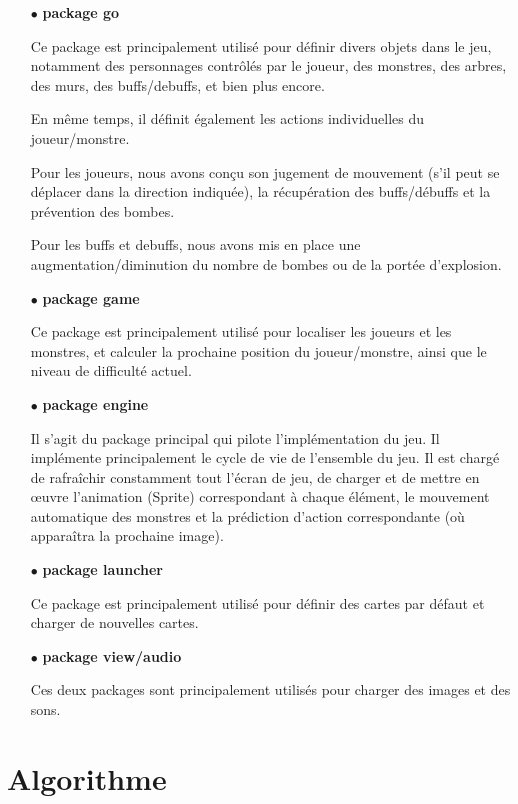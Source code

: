 \documentclass[11pt,english]{article}
\begin{document}
\begin{itemize}
    \item [$\bullet$] \textbf{package go}
    
    Ce package est principalement utilisé pour définir divers objets dans le jeu, notamment des personnages contrôlés par le joueur, des monstres, des arbres, des murs, des buffs/debuffs, et bien plus encore.
    
    En même temps, il définit également les actions individuelles du joueur/monstre. 

    Pour les joueurs, nous avons conçu son jugement de mouvement (s'il peut se déplacer dans la direction indiquée), la récupération des buffs/débuffs et la prévention des bombes.

    Pour les buffs et debuffs, nous avons mis en place une augmentation/diminution du nombre de bombes ou de la portée d'explosion.

    \item [$\bullet$] \textbf{package game}
    
    Ce package est principalement utilisé pour localiser les joueurs et les monstres, et calculer la prochaine position du joueur/monstre, ainsi que le niveau de difficulté actuel.

    \item [$\bullet$] \textbf{package engine}
    
    Il s'agit du package principal qui pilote l'implémentation du jeu. Il implémente principalement le cycle de vie de l’ensemble du jeu. Il est chargé de rafraîchir constamment tout l'écran de jeu, de charger et de mettre en œuvre l'animation (Sprite) correspondant à chaque élément, le mouvement automatique des monstres et la prédiction d'action correspondante (où apparaîtra la prochaine image).

    \item [$\bullet$] \textbf{package launcher}
    
    Ce package est principalement utilisé pour définir des cartes par défaut et charger de nouvelles cartes.

    \item [$\bullet$] \textbf{package view/audio}
    
    Ces deux packages sont principalement utilisés pour charger des images et des sons.
    

\end{itemize}

\section{Algorithme}
\end{document}
